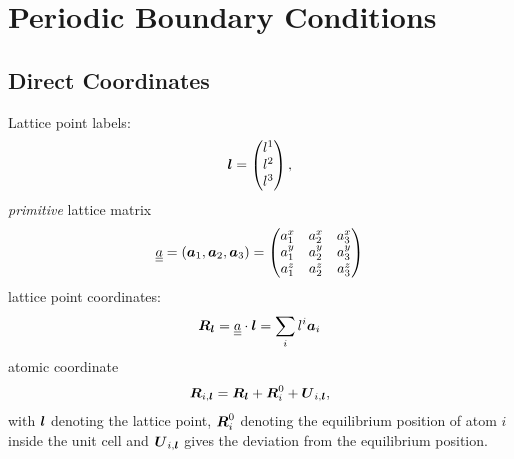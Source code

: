 \section{Periodic Boundary Conditions}
\subsection{Direct Coordinates}
Lattice point labels:
\begin{align}
\boldsymbol{l}
= \begin{pmatrix}
l^1 \\ l^2 \\ l^3
\end{pmatrix},
\end{align}
\emph{primitive} lattice matrix
\begin{align}
\underline{\underline{{a}}} = \left( \boldsymbol{a}_1, \boldsymbol{a}_2, \boldsymbol{a}_3 \right)
= \begin{pmatrix}
a_1^x & a_2^x & a_3^x \\
a_1^y & a_2^y & a_3^y \\
a_1^z & a_2^z & a_3^z
\end{pmatrix}
\end{align}
lattice point coordinates:
\begin{align}
\boldsymbol{R}_{\boldsymbol{l}} = \underline{\underline{{a}}} \cdot \boldsymbol{l} = \sum_i l^i \boldsymbol{a}_i
\end{align}
atomic coordinate
\begin{align}
\boldsymbol{R}_{i, \boldsymbol{l}} = \boldsymbol{R}_{\boldsymbol{l}} + \boldsymbol{R}^0_{i} +  \boldsymbol{U}_{i, \boldsymbol{l}},
\label{eq:R_il}
\end{align}
with $\boldsymbol{l}$ denoting the lattice point, $\boldsymbol{R}^0_{i}$ denoting the 
equilibrium position of atom $i$ inside the unit cell and $\boldsymbol{U}_{i, \boldsymbol{l}}$ 
gives the deviation from the equilibrium position.

